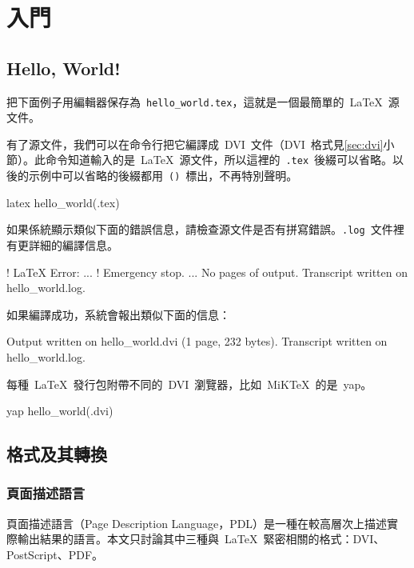 \chapter{入門}

\section{Hello, World!}
\label{sec:hello_world}
把下面例子用編輯器保存為~\verb|hello_world.tex|，這就是一個最簡單的~\LaTeX~源文件。


有了源文件，我們可以在命令行把它編譯成~DVI~文件（DVI~格式見\ref{sec:dvi}小節）。此命令知道輸入的是~\LaTeX~源文件，所以這裡的~\verb|.tex|~後綴可以省略。以後的示例中可以省略的後綴都用~\verb|()|~標出，不再特別聲明。
\begin{code}
latex hello_world(.tex)
\end{code}

如果係統顯示類似下面的錯誤信息，請檢查源文件是否有拼寫錯誤。\verb|.log|~文件裡有更詳細的編譯信息。
\begin{code}
! LaTeX Error:
...
! Emergency stop.
...
No pages of output.
Transcript written on hello_world.log.
\end{code}

如果編譯成功，系統會報出類似下面的信息：
\begin{code}
Output written on hello_world.dvi (1 page, 232 bytes).
Transcript written on hello_world.log.
\end{code}

每種~\LaTeX~發行包附帶不同的~DVI~瀏覽器，比如~MiKTeX~的是~yap。
\begin{code}
yap hello_world(.dvi)
\end{code}

\section{格式及其轉換}
\subsection{頁面描述語言}
\label{sec:pdl}
頁面描述語言（Page Description Language，PDL）是一種在較高層次上描述實際輸出結果的語言。本文只討論其中三種與~\LaTeX~緊密相關的格式：DVI、PostScript、PDF。

